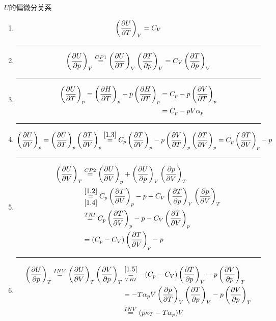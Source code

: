 \begin{example}
    \(U\)的偏微分关系
    \begin{enumerate}
        \item \[\left(\frac{\partial U}{\partial T}\right)_V =C_V
        \]
        \hrule
        \item\label{1.2} \[\left(\frac{\partial U}{\partial p}\right)_V
        \overset{CP1}{=}\left(\frac{\partial U}{\partial T}\right)_V\left(\frac{\partial T}{\partial p}\right)_V
        =C_V\left(\frac{\partial T}{\partial p}\right)_V
        \]
        \hrule
        \item\label{1.3} \begin{align*}
            \left(\frac{\partial U}{\partial T}\right)_p
            =\left(\frac{\partial H}{\partial T}\right)_p
            -p\left(\frac{\partial H}{\partial T}\right)_p
            &=C_p -p\left(\frac{\partial V}{\partial T}\right)_p\\
            &=C_p -pV\alpha_p
        \end{align*}
        \hrule
        \item\label{1.4} \[\left(\frac{\pa U}{\pa V}\right)_p=
        \left(\frac{\pa U}{\pa T}\right)_p\left(\frac{\pa T}{\pa V}\right)_p
        \overset{\ref*{1.3}}{=}
        C_p \left(\frac{\pa T}{\pa V}\right)_p-p\left(\frac{\pa V}{\pa T}\right)_p\left(\frac{\pa T}{\pa V}\right)_p
        =C_p \left(\frac{\pa T}{\pa V}\right)_p-p
        \]
        \hrule
        \item\label{1.5} \begin{align*}
            \left(\frac{\pa U}{\pa V}\right)_T 
            &\overset{CP2}{=}\left(\frac{\pa U}{\pa V}\right)_p+
            \left(\frac{\pa U}{\pa p}\right)_V\left(\frac{\pa p}{\pa V}\right)_T\\
            &\overunderset{\ref*{1.2}}{\ref*{1.4}}{=}
            C_p\left(\frac{\pa T}{\pa V}\right)_p-p+C_V 
            \left(\frac{\pa T}{\pa p}\right)_V\left(\frac{\pa p}{\pa V}\right)_T \\
            &\overset{TRI}{=}C_p\left(\frac{\pa T}{\pa V}\right)_p-p -C_V 
            \left(\frac{\pa T}{\pa V}\right)_p \\
            &=(C_p-C_V)\left(\frac{\pa T}{\pa V}\right)_p-p
        \end{align*}
        \hrule
        \item \begin{align*}
            \left(\frac{\pa U}{\pa p}\right)_T
            \overset{INV}{=}\left(\frac{\pa U}{\pa V}\right)_T\left(\frac{\pa V}{\pa p}\right)_T
            &\overunderset{\ref*{1.5}}{TRI}{=}
            -(C_p-C_V)\left(\frac{\pa T}{\pa p}\right)_V-p\left(\frac{\pa V}{\pa p}\right)_T\\
            &= -T \alpha_pV \left( \frac{\partial p}{\partial T} \right)_V \left(\frac{\pa T}{\pa p}\right)_V
            -p\left(\frac{\pa V}{\pa p}\right)_T
            \\&\overset{INV}{=}(p\kappa_T -T \alpha_p)V
        \end{align*}
    \end{enumerate}
\end{example}
